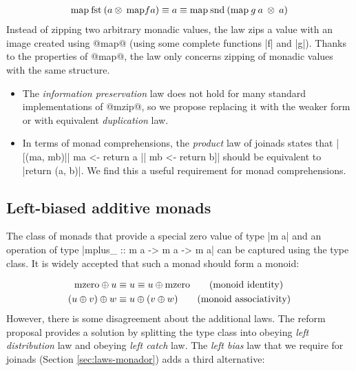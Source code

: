 \documentclass[preprint]{sigplanconf}
\begin{document}
\begin{align*}
  \text{map} \: \text{fst} \: (a \otimes \: \text{map} f a) \equiv a \equiv \text{map} \: \text{snd} \: (\text{map} \: g \: a \: \otimes \: a)
\end{align*}
Instead of zipping two arbitrary monadic values, the law zips a value with an image created using 
@map@ (using some complete functions |f| and |g|). Thanks to the properties of @map@,
the law only concerns zipping of monadic values with the same structure.

\begin{itemize}
\item The \textit{information preservation} law does not hold for many standard implementations of 
  @mzip@, so we propose replacing it with the weaker form or with equivalent \textit{duplication} law.

\item In terms of monad comprehensions, the \textit{product} law of joinads states that 
  |[(ma, mb)|| ma <- return a || mb <- return b]| should be equivalent to |return (a, b)|. We find 
  this a useful requirement for monad comprehensions.
\end{itemize}


\subsection{Left-biased additive monads}
\label{sec:proposals-morelse}

The class of monads that provide a special zero value of type |m a| and an operation of type 
|mplus_ :: m a -> m a -> m a| can be captured using the  type class. It is widely 
accepted that such a monad should form a monoid:

\begin{align*}
  \text{mzero} \oplus u &\equiv u \equiv u \oplus \text{mzero} \tag{monoid identity}\\
  (u \oplus v) \oplus w &\equiv u \oplus (v \oplus w) \tag{monoid associativity}
\end{align*}
However, there is some disagreement about the additional laws. The  reform proposal
\cite{monadplusreform} provides a solution by splitting the type class into  
obeying \textit{left distribution} law and  obeying \textit{left catch} law. The
\textit{left bias} law that we require for joinads (Section \ref{sec:laws-monador}) adds a third
alternative:
\end{document}
